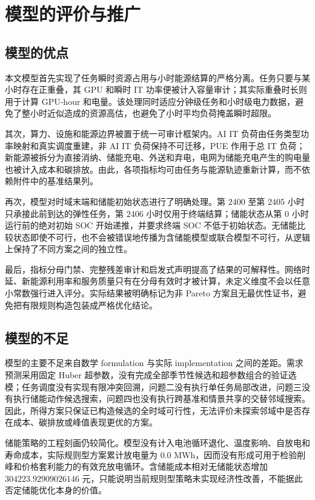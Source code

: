 \section{模型的评价与推广}

\subsection{模型的优点}

本文模型首先实现了任务瞬时资源占用与小时能源结算的严格分离。任务只要与某小时存在正重叠，其 GPU 和瞬时 IT 功率便被计入容量审计；其实际重叠时长则用于计算 GPU-hour 和电量。该处理同时适应分钟级任务和小时级电力数据，避免了整小时近似造成的资源高估，也避免了小时平均负荷掩盖瞬时超限。

其次，算力、设施和能源边界被置于统一可审计框架内。AI IT 负荷由任务类型功率映射和真实调度重建，非 AI IT 负荷保持不可迁移，PUE 作用于总 IT 负荷；新能源被拆分为直接消纳、储能充电、外送和弃电，电网为储能充电产生的购电量也被计入成本和碳排放。由此，各项指标均可由任务与能源轨迹重新计算，而不依赖附件中的基准结果列。

再次，模型对时域末端和储能初始状态进行了明确处理。第 $2400$ 至第 $2405$ 小时只承接此前到达的弹性任务，第 $2406$ 小时仅用于终端结算；储能状态从第 $0$ 小时运行前的绝对初始 SOC 开始递推，并要求终端 SOC 不低于初始状态。无储能比较状态即使不可行，也不会被错误地传播为含储能模型或联合模型不可行，从逻辑上保持了不同方案之间的独立性。

最后，指标分母门禁、完整残差审计和启发式声明提高了结果的可解释性。网络时延、新能源利用率和服务质量只有在分母有效时才被计算，未定义维度不会以任意小常数强行进入评分。实际结果被明确标记为非 Pareto 方案且无最优性证书，避免把有限规则构造包装成严格优化结论。

\subsection{模型的不足}

模型的主要不足来自数学 formulation 与实际 implementation 之间的差距。需求预测采用固定 Huber 超参数，没有完成全部季节性候选和超参数组合的验证选模；任务调度没有实现有限冲突回溯，问题二没有执行单任务局部改进，问题三没有执行储能动作候选搜索，问题四也没有执行跨基准和情景共享的交替邻域搜索。因此，所得方案只保证已构造候选的全时域可行性，无法评价未探索邻域中是否存在成本、碳排放或峰值表现更优的方案。

储能策略的工程刻画仍较简化。模型没有计入电池循环退化、温度影响、自放电和寿命成本，实际规则型方案累计放电量为 $0.0$ MWh，因而没有形成可用于检验削峰和价格套利能力的有效充放电循环。含储能成本相对无储能状态增加 $304223.92909026146$ 元，只能说明当前规则型策略未实现经济性改善，不能据此否定储能优化本身的价值。

